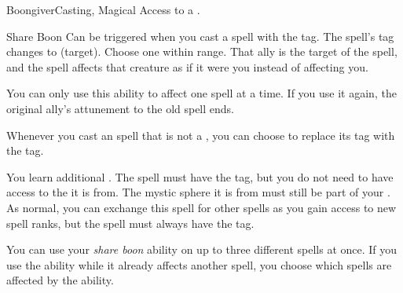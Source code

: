   \begin{magicalfeat}{Boongiver}{Casting, Magical}
    \featpre Access to a .

    \begin{magicalactiveability}{Share Boon}
      \abilityusagetime Can be triggered when you cast a spell with the  tag.
      \rankline
      The spell's  tag changes to  (target).
      Choose one  within \rngmed range.
      That ally is the target of the spell, and the spell affects that creature as if it were you instead of affecting you.

      You can only use this ability to affect one spell at a time.
      If you use it again, the original ally's attunement to the old spell ends.
    \end{magicalactiveability}

     Whenever you cast an  spell that is not a , you can choose to replace its  tag with the  tag.

     You learn additional .
    The spell must have the  tag, but you do not need to have access to the  it is from.
    The mystic sphere it is from must still be part of your .
    As normal, you can exchange this spell for other spells as you gain access to new spell ranks, but the spell must always have the  tag.

     You can use your \textit{share boon} ability on up to three different spells at once.
    If you use the ability while it already affects another spell, you choose which spells are affected by the ability.
  \end{magicalfeat}

